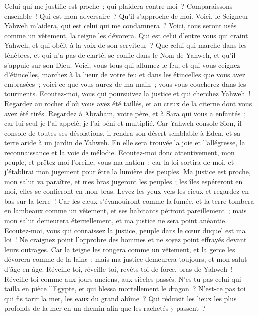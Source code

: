 \begin{multicols}{2}
Celui qui me justifie est proche~; qui plaidera contre moi~? Comparaissons ensemble~! Qui est mon adversaire~? Qu'il s'approche de moi.
Voici, le Seigneur Yahweh m'aidera, qui est celui qui me condamnera~? Voici, tous seront usés comme un vêtement, la teigne les dévorera.
Qui est celui d'entre vous qui craint Yahweh, et qui obéit à la voix de son serviteur~? Que celui qui marche dans les ténèbres, et qui n'a pas de clarté, se confie dans le Nom de Yahweh, et qu'il s'appuie sur son Dieu.
Voici, vous tous qui allumez le feu, et qui vous ceignez d'étincelles, marchez à la lueur de votre feu et dans les étincelles que vous avez embrasées~; voici ce que vous aurez de ma main~; vous vous coucherez dans les tourments.
\VerseOne{}Ecoutez-moi, vous qui poursuivez la justice et qui cherchez Yahweh~! Regardez au rocher d'où vous avez été taillés, et au creux de la citerne dont vous avez été tirés.
Regardez à Abraham, votre père, et à Sara qui vous a enfantés~; car lui seul je l'ai appelé, je l'ai béni et multiplié.
Car Yahweh console Sion, il console de toutes ses désolations, il rendra son désert semblable à Eden, et sa terre aride à un jardin de Yahweh. En elle sera trouvée la joie et l'allégresse, la reconnaissance et la voie de mélodie.
Ecoutez-moi donc attentivement, mon peuple, et prêtez-moi l'oreille, vous ma nation~; car la loi sortira de moi, et j'établirai mon jugement pour être la lumière des peuples.
Ma justice est proche, mon salut va paraître, et mes bras jugeront les peuples~; les îles espéreront en moi, elles se confieront en mon bras.
Levez les yeux vers les cieux et regardez en bas sur la terre~! Car les cieux s'évanouiront comme la fumée, et la terre tombera en lambeaux comme un vêtement, et ses habitants périront pareillement~; mais mon salut demeurera éternellement, et ma justice ne sera point anéantie.
Ecoutez-moi, vous qui connaissez la justice, peuple dans le cœur duquel est ma loi~! Ne craignez point l'opprobre des hommes et ne soyez point effrayés devant leurs outrages.
Car la teigne les rongera comme un vêtement, et la gerce les dévorera comme de la laine~; mais ma justice demeurera toujours, et mon salut d'âge en âge.
Réveille-toi, réveille-toi, revêts-toi de force, bras de Yahweh~! Réveille-toi comme aux jours anciens, aux siècles passés. N'es-tu pas celui qui tailla en pièce l'Egypte, et qui blessa mortellement le dragon~?
N'est-ce pas toi qui fis tarir la mer, les eaux du grand abîme~? Qui réduisit les lieux les plus profonds de la mer en un chemin afin que les rachetés y passent~?

\end{multicols}

